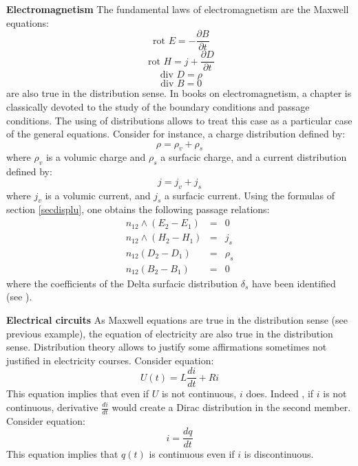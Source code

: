 \documentclass[12pt]{book}
\begin{document}
\begin{exmp}{\bf Electromagnetism}
The fundamental laws of electromagnetism are the Maxwell
equations: 
\begin{equation}
\mbox{ rot } E=-\frac{\partial B}{\partial t}
\end{equation}
\begin{equation}
\mbox{ rot } H=j+\frac{\partial D}{\partial t}
\end{equation}
\begin{equation}
\mbox{ div } D=\rho
\end{equation}
\begin{equation}
\mbox{ div } B=0
\end{equation}
are also true in the distribution sense.
In books on electromagnetism, a chapter is classically devoted to the study of
the boundary conditions and passage conditions. The using of distributions
allows to treat this case as a particular case of the general equations.
Consider for instance, a charge distribution defined by:
\begin{equation}
\rho=\rho_v+\rho_s
\end{equation}
where $\rho_v$ is a volumic charge and $\rho_s$ a surfacic charge, and a
current distribution defined by:
\begin{equation}
j=j_v+j_s
\end{equation}
where $j_v$ is a volumic current, and $j_s$ a surfacic current. Using the
formulas of section \ref{secdisplu}, one obtains the following passage
relations:
\begin{eqnarray}
n_{12}\wedge(E_2-E_1)&=&0\\
n_{12}\wedge(H_2-H_1)&=&j_s\\
n_{12}(D_2-D_1)&=&\rho_s\\
n_{12}(B_2-B_1)&=&0
\end{eqnarray}
where the coefficients of the Delta surfacic distribution $\delta_s$ have been
identified (see \cite{ma:distr:Schwartz65}).
\end{exmp}

\begin{exmp}{\bf Electrical circuits}
As Maxwell equations are true in the distribution sense (see previous
example), the equation of electricity are also true in the
distribution sense. Distribution theory
allows to justify some affirmations sometimes not justified in electricity
courses. Consider equation:
\begin{equation}
U(t)=L\frac{di}{dt}+Ri
\end{equation}
This equation implies that even if $U$ is not continuous, $i$ does. Indeed ,
if $i$ is not continuous, derivative
$\frac{di}{dt}$ would create a Dirac distribution in the second member.
Consider equation:
\begin{equation}
i=\frac{dq}{dt}
\end{equation}
This equation implies that $q(t)$ is continuous even if $i$
is discontinuous.
\end{exmp}
\end{document}
